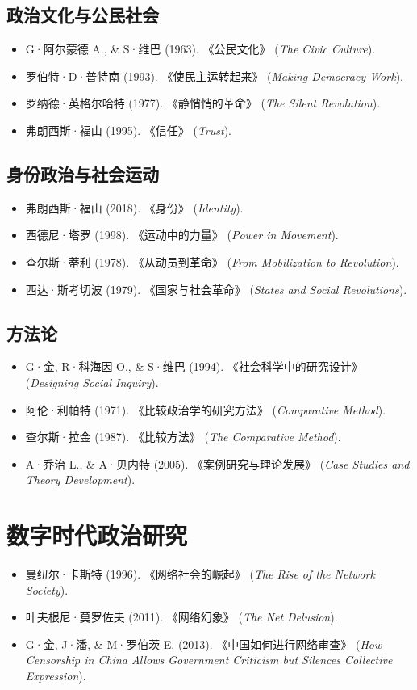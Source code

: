 \documentclass[a5paper, 11pt, openany]{ctexbook}
\begin{document}
\subsection*{政治文化与公民社会}
\begin{itemize}
    \item G·阿尔蒙德 A., \& S·维巴 (1963). 《公民文化》 (\textit{The Civic Culture}).
    \item 罗伯特·D·普特南 (1993). 《使民主运转起来》 (\textit{Making Democracy Work}).
    \item 罗纳德·英格尔哈特 (1977). 《静悄悄的革命》 (\textit{The Silent Revolution}).
    \item 弗朗西斯·福山 (1995). 《信任》 (\textit{Trust}).
\end{itemize}

\subsection*{身份政治与社会运动}
\begin{itemize}
    \item 弗朗西斯·福山 (2018). 《身份》 (\textit{Identity}).
    \item 西德尼·塔罗 (1998). 《运动中的力量》 (\textit{Power in Movement}).
    \item 查尔斯·蒂利 (1978). 《从动员到革命》 (\textit{From Mobilization to Revolution}).
    \item 西达·斯考切波 (1979). 《国家与社会革命》 (\textit{States and Social Revolutions}).
\end{itemize}

\subsection*{方法论}
\begin{itemize}
    \item G·金, R·科海因 O., \& S·维巴 (1994). 《社会科学中的研究设计》 (\textit{Designing Social Inquiry}).
    \item 阿伦·利帕特 (1971). 《比较政治学的研究方法》 (\textit{Comparative Method}).
    \item 查尔斯·拉金 (1987). 《比较方法》 (\textit{The Comparative Method}).
    \item A·乔治 L., \& A·贝内特 (2005). 《案例研究与理论发展》 (\textit{Case Studies and Theory Development}).
\end{itemize}

\section*{数字时代政治研究}
\begin{itemize}
    \item 曼纽尔·卡斯特 (1996). 《网络社会的崛起》 (\textit{The Rise of the Network Society}).
    \item 叶夫根尼·莫罗佐夫 (2011). 《网络幻象》 (\textit{The Net Delusion}).
    \item G·金, J·潘, \& M·罗伯茨 E. (2013). 《中国如何进行网络审查》 (\textit{How Censorship in China Allows Government Criticism but Silences Collective Expression}).
\end{itemize}
\end{document}
